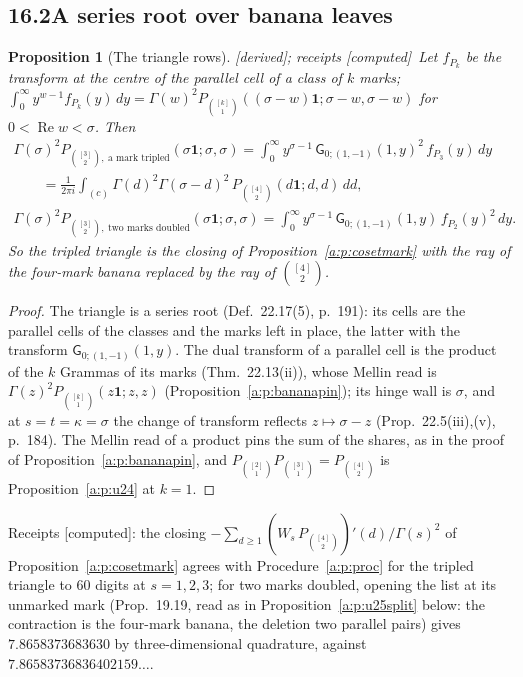 \documentclass[11pt]{article}
\newcommand{\one}{\mathbf 1}
\newcommand{\sG}{\mathsf G}
\DeclareMathOperator{\re}{Re}
\theoremstyle{plain}
\newtheorem{proposition}{Proposition}[section]
\theoremstyle{definition}
\theoremstyle{remark}
\newcommand{\derived}{\textup{[derived]}}
\newcommand{\computed}{\textup{[computed]}}
\begin{document}
\subsection*{16.2\quad A series root over banana leaves}

\begin{proposition}[The triangle rows]\label{a:p:triangles}\derived; receipts \computed\
Let $f_{P_k}$ be the transform at the centre of the parallel cell of a class of $k$ marks; $\int_0^\infty y^{w-1}f_{P_k}(y)\,dy=\Gamma(w)^2P_{\binom{[k]}1}((\sigma-w)\one;\sigma-w,\sigma-w)$ for $0<\re w<\sigma$. Then
\begin{gather*}
\Gamma(\sigma)^2P_{\binom{[3]}2,\ \text{a mark tripled}}(\sigma\one;\sigma,\sigma)=\int_0^\infty y^{\sigma-1}\,\sG_{0;(1,-1)}(1,y)^2\,f_{P_3}(y)\,dy\\
\qquad=\frac1{2\pi i}\int_{(c)}\Gamma(d)^2\Gamma(\sigma-d)^2\,P_{\binom{[4]}2}(d\one;d,d)\,dd,\\
\Gamma(\sigma)^2P_{\binom{[3]}2,\ \text{two marks doubled}}(\sigma\one;\sigma,\sigma)=\int_0^\infty y^{\sigma-1}\,\sG_{0;(1,-1)}(1,y)\,f_{P_2}(y)^2\,dy .
\end{gather*}
So the tripled triangle is the closing of Proposition~\ref{a:p:cosetmark} with the ray of the four-mark banana replaced by the ray of $\binom{[4]}2$.
\end{proposition}

\begin{proof}
The triangle is a series root (Def.~22.17(5), p.~191): its cells are the parallel cells of the classes and the marks left in place, the latter with the transform $\sG_{0;(1,-1)}(1,y)$. The dual transform of a parallel cell is the product of the $k$ Grammas of its marks (Thm.~22.13(ii)), whose Mellin read is $\Gamma(z)^2P_{\binom{[k]}1}(z\one;z,z)$ (Proposition~\ref{a:p:bananapin}); its hinge wall is $\sigma$, and at $s=t=\kappa=\sigma$ the change of transform reflects $z\mapsto\sigma-z$ (Prop.~22.5(iii),(v), p.~184). The Mellin read of a product pins the sum of the shares, as in the proof of Proposition~\ref{a:p:bananapin}, and $P_{\binom{[2]}1}P_{\binom{[3]}1}=P_{\binom{[4]}2}$ is Proposition~\ref{a:p:u24} at $k=1$.
\end{proof}

\noindent Receipts \computed: the closing $-\sum_{d\ge1}(W_s\,P_{\binom{[4]}2})'(d)/\Gamma(s)^2$ of Proposition~\ref{a:p:cosetmark} agrees with Procedure~\ref{a:p:proc} for the tripled triangle to $60$ digits at $s=1,2,3$; for two marks doubled, opening the list at its unmarked mark (Prop.~19.19, read as in Proposition~\ref{a:p:u25split} below: the contraction is the four-mark banana, the deletion two parallel pairs) gives $7.8658373683630$ by three-dimensional quadrature, against $7.86583736836402159\ldots$.
\end{document}
